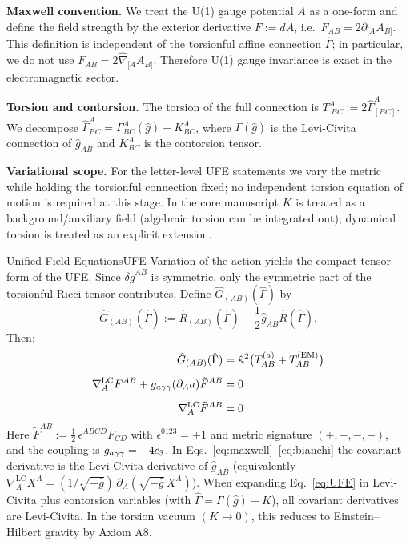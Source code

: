 \noindent\textbf{Maxwell convention.} We treat the U(1) gauge potential $A$ as a one-form and define the field strength by the exterior derivative
$F := dA$, i.e.\ $F_{AB}=2\partial_{[A}A_{B]}$. This definition is independent of the torsionful affine connection $\hat{\Gamma}$; in particular, we do not use $F_{AB}=2\hat{\nabla}_{[A}A_{B]}$. Therefore U(1) gauge invariance is exact in the electromagnetic sector.

\noindent\textbf{Torsion and contorsion.} The torsion of the full connection is $T^A_{\;BC}:=2\hat{\Gamma}^A_{[BC]}$. We decompose
$\hat{\Gamma}^A_{BC}=\Gamma^A_{BC}(\hat{g})+K^A_{BC}$, where $\Gamma(\hat{g})$ is the Levi-Civita connection of $\hat{g}_{AB}$ and $K^A_{BC}$ is the contorsion tensor.

\noindent\textbf{Variational scope.} For the letter-level UFE statements we vary the metric while holding the torsionful connection fixed; no independent torsion equation of motion is required at this stage. In the core manuscript $K$ is treated as a background/auxiliary field (algebraic torsion can be integrated out); dynamical torsion is treated as an explicit extension.

\begin{theorem}{Unified Field Equations}{UFE}
Variation of the action yields the compact tensor form of the UFE. Since $\delta\hat{g}^{AB}$ is symmetric, only the symmetric part of the torsionful Ricci tensor contributes. Define
$\hat{G}_{(AB)}(\hat{\Gamma})$ by
\begin{equation*}
    \hat{G}_{(AB)}(\hat{\Gamma}) := \hat{R}_{(AB)}(\hat{\Gamma}) - \frac{1}{2}\hat{g}_{AB}\hat{R}(\hat{\Gamma}).
\end{equation*}
Then:
\begin{align}
    \hat{G}_{(AB)}(\hat{\Gamma})
        &= \hat{\kappa}^2\bigl(T^{(a)}_{AB} + T^{(\text{EM})}_{AB}\bigr)
        \label{eq:UFE}\\[0.5em]
    \nabla^{\mathrm{LC}}_A F^{AB} + g_{a\gamma\gamma}(\partial_A a)\tilde{F}^{AB} &= 0
        \label{eq:maxwell}\\[0.5em]
    \nabla^{\mathrm{LC}}_A\tilde{F}^{AB} &= 0
        \label{eq:bianchi}
\end{align}
Here $\tilde{F}^{AB} := \tfrac12\,\epsilon^{ABCD}F_{CD}$ with $\epsilon^{0123}=+1$ and
metric signature $(+,-,-,-)$, and the coupling is $g_{a\gamma\gamma}=-4c_3$.
In Eqs.~\eqref{eq:maxwell}--\eqref{eq:bianchi} the covariant derivative is the Levi-Civita derivative of $\hat{g}_{AB}$ (equivalently $\nabla^{\mathrm{LC}}_A X^A=(1/\sqrt{-\hat{g}})\,\partial_A(\sqrt{-\hat{g}}\,X^A)$).
When expanding Eq.~\eqref{eq:UFE} in Levi-Civita plus contorsion variables (with $\hat{\Gamma}=\Gamma(\hat{g})+K$), all covariant derivatives are Levi-Civita.
In the torsion vacuum $(K \to 0)$, this reduces to Einstein--Hilbert gravity 
by Axiom A8.
\end{theorem}

